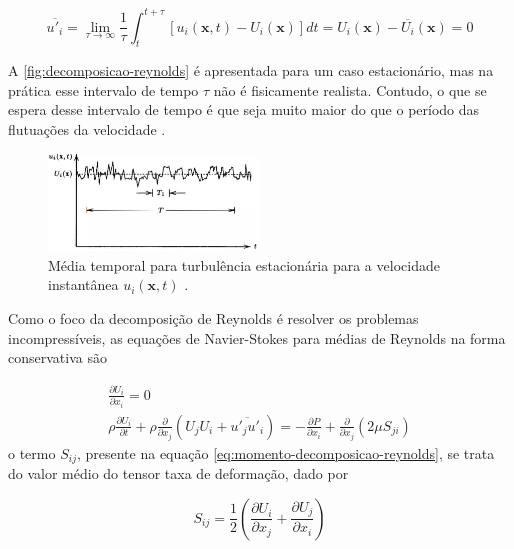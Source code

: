 \begin{equation}
	\overline{u'_{i}} = \lim_{\tau \rightarrow \infty} \frac{1}{\tau}\int_{t}^{t+\tau} \left[u_i(\textbf{x},t) - U_i(\textbf{x}) \right] dt = U_i(\textbf{x}) - \overline{U_{i}}(\textbf{x}) = 0
\end{equation}

A \autoref{fig:decomposicao-reynolds} é apresentada para um caso estacionário, mas na prática esse intervalo de tempo $\tau$ não é fisicamente realista. Contudo, o que se espera desse intervalo de tempo é que seja muito maior do que o período das flutuações da velocidade \cite{Wilcox2006}. 

\begin{figure}[!ht]
	\centering
	\includegraphics[width=0.5\textwidth]{foto01-decomposicao-reynolds.png}   
	\caption[Média temporal para turbulência estacionária para a velocidade instantânea $u_i(\textbf{x},t)$.]{Média temporal para turbulência estacionária para a velocidade instantânea $u_i(\textbf{x},t)$ \cite{Wilcox2006}.}
	\label{fig:decomposicao-reynolds}
\end{figure}

Como o foco da decomposição de Reynolds é resolver os problemas incompressíveis, as equações de Navier-Stokes para médias de Reynolds na forma conservativa são

\begin{gather}
	\label{eq:continuidade-decomposicao-reynolds}
	\frac{\partial U_i}{\partial x_i} = 0 \\
	\label{eq:momento-decomposicao-reynolds}
	\rho\frac{\partial U_i}{\partial t} + \rho\frac{\partial}{\partial x_j}\left(U_{j}U_{i} + \overline{u'_j u'_i} \right) = -\frac{\partial P}{\partial x_i} + \frac{\partial}{\partial x_j}\left(2\mu S_{ji}\right)
\end{gather}
%
o termo $S_{ij}$, presente na equação \ref{eq:momento-decomposicao-reynolds}, se trata do valor médio do tensor taxa de deformação, dado por

\begin{equation}
    \label{eq:tensor-medio-taxadeformacao}
    S_{ij} = \frac{1}{2}\left(\frac{\partial U_i}{\partial x_j} + \frac{\partial U_j}{\partial x_i} \right)
\end{equation}

